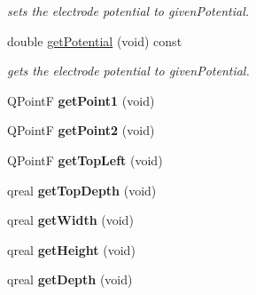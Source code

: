 \begin{DoxyCompactItemize}
\begin{DoxyCompactList}\small\item\em sets the electrode potential to given\+Potential. \end{DoxyCompactList}\item 
double \hyperlink{classprim_1_1Electrode_a1cc37c6f2cca529cebf3769172adbd3c}{get\+Potential} (void) const \hypertarget{classprim_1_1Electrode_a1cc37c6f2cca529cebf3769172adbd3c}{}\label{classprim_1_1Electrode_a1cc37c6f2cca529cebf3769172adbd3c}

\begin{DoxyCompactList}\small\item\em gets the electrode potential to given\+Potential. \end{DoxyCompactList}\item 
Q\+PointF {\bfseries get\+Point1} (void)\hypertarget{classprim_1_1Electrode_ad04a8f9556a1826755eae2ce074e0b9a}{}\label{classprim_1_1Electrode_ad04a8f9556a1826755eae2ce074e0b9a}

\item 
Q\+PointF {\bfseries get\+Point2} (void)\hypertarget{classprim_1_1Electrode_a035953e2a9d0a9c677846dc403f73c3a}{}\label{classprim_1_1Electrode_a035953e2a9d0a9c677846dc403f73c3a}

\item 
Q\+PointF {\bfseries get\+Top\+Left} (void)\hypertarget{classprim_1_1Electrode_aed20c1872db9d76852c713462399bca6}{}\label{classprim_1_1Electrode_aed20c1872db9d76852c713462399bca6}

\item 
qreal {\bfseries get\+Top\+Depth} (void)\hypertarget{classprim_1_1Electrode_a2000e1e634b0cb469bbd0d5bf97c1977}{}\label{classprim_1_1Electrode_a2000e1e634b0cb469bbd0d5bf97c1977}

\item 
qreal {\bfseries get\+Width} (void)\hypertarget{classprim_1_1Electrode_a3bd6eba499c1e975d03ef3af51d6c4d1}{}\label{classprim_1_1Electrode_a3bd6eba499c1e975d03ef3af51d6c4d1}

\item 
qreal {\bfseries get\+Height} (void)\hypertarget{classprim_1_1Electrode_af38e81c23915d966223357fc4de3a08b}{}\label{classprim_1_1Electrode_af38e81c23915d966223357fc4de3a08b}

\item 
qreal {\bfseries get\+Depth} (void)\hypertarget{classprim_1_1Electrode_ade46d0bd594437e8342f788bd399873e}{}\label{classprim_1_1Electrode_ade46d0bd594437e8342f788bd399873e}


\end{DoxyCompactItemize}

